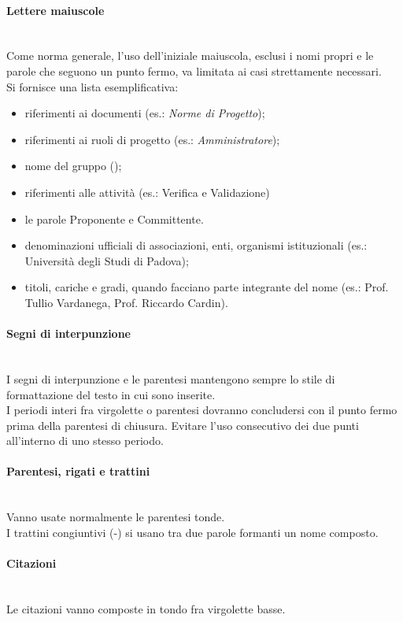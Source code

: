 \paragraph{Lettere maiuscole}\label{sec:lettere_maiuscole} \mbox{} \\
Come norma generale, l'uso dell'iniziale maiuscola, esclusi i nomi propri e le parole che seguono un punto fermo, va limitata ai casi strettamente necessari.\\
Si fornisce una lista esemplificativa:
\begin{itemize}
	\item riferimenti ai documenti (es.: \textit{Norme di Progetto});
	\item riferimenti ai ruoli di progetto (es.: \textit{Amministratore});
	\item nome del gruppo (\GroupName);
	\item riferimenti alle attività (es.: Verifica e Validazione) 
	\item le parole Proponente e Committente.
	\item denominazioni ufficiali di associazioni, enti, organismi istituzionali (es.: Università degli Studi di Padova);
	\item titoli, cariche e gradi, quando facciano parte integrante del nome (es.: Prof. Tullio Vardanega, Prof. Riccardo Cardin).
\end{itemize}

\paragraph{Segni di interpunzione} \mbox{} \\
I segni di interpunzione e le parentesi mantengono sempre lo stile di formattazione del testo in cui sono inserite.\\
I periodi interi fra virgolette o parentesi dovranno concludersi con il punto fermo prima della parentesi di chiusura.
Evitare l’uso consecutivo dei due punti all'interno di uno stesso periodo.

\paragraph{Parentesi, rigati e trattini} \mbox{} \\
Vanno usate normalmente le parentesi tonde.\\
I trattini congiuntivi (-) si usano tra due parole formanti un nome composto.

\paragraph{Citazioni} \mbox{} \\
Le citazioni vanno composte in tondo fra virgolette basse.

